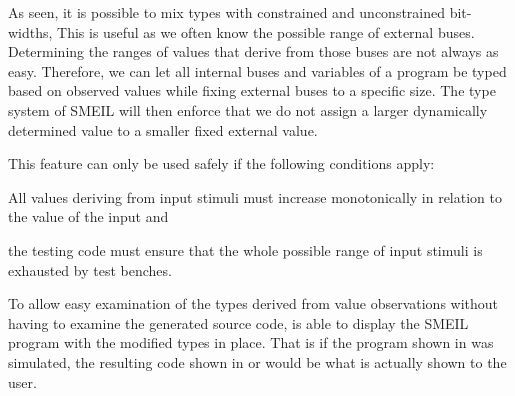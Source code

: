 As seen, it is possible to mix types with constrained and unconstrained
bit-widths, This is useful as we often know the possible range of external
buses. Determining the ranges of values that derive from those buses are not
always as easy. Therefore, we can let all internal buses and variables of a
program be typed based on observed values while fixing external buses to a
specific size. The type system of SMEIL will then enforce that we do not assign
a larger dynamically determined value to a smaller fixed external value.

This feature can only be used safely if the following conditions
apply: \begin{inparaenum}[1)] \item All values deriving from input stimuli must
  increase monotonically in relation to the value of the input and \item the
  testing code must ensure that the whole possible range of input stimuli is
  exhausted by test benches.
\end{inparaenum}

To allow easy examination of the types derived from value observations without
having to examine the generated source code, \libsme{} is able to display the
SMEIL program with the modified types in place. That is if the program shown in
 was simulated, the resulting code shown in
 or  would be what is actually shown
to the user.


